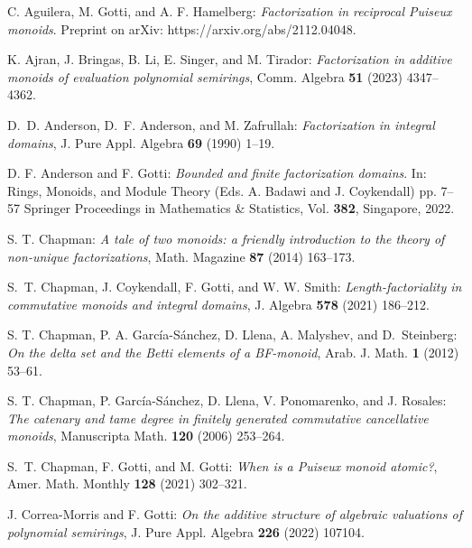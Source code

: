 \documentclass[12pt]{amsart}
\theoremstyle{definition}
\numberwithin{equation}{section}
\begin{document}
\bigskip
\begin{thebibliography}{20}
	
	 C. Aguilera, M. Gotti, and A. F. Hamelberg: \emph{Factorization in reciprocal Puiseux monoids}. Preprint on arXiv: https://arxiv.org/abs/2112.04048.
	
	 K. Ajran, J. Bringas, B. Li, E. Singer, and M. Tirador: \emph{Factorization in additive monoids of evaluation polynomial semirings}, Comm. Algebra \textbf{51} (2023) 4347--4362.
	
	 D.~D. Anderson, D.~F. Anderson, and M. Zafrullah: \emph{Factorization in integral domains}, J. Pure Appl. Algebra \textbf{69} (1990) 1--19.

	 D. F. Anderson and F. Gotti: \emph{Bounded and finite factorization domains}. In: Rings, Monoids, and Module Theory (Eds. A. Badawi and J. Coykendall) pp. 7--57 Springer Proceedings in Mathematics \& Statistics, Vol. \textbf{382}, Singapore, 2022.

	 S. T. Chapman: \emph{A tale of two monoids: a friendly introduction to the theory of non-unique factorizations}, Math. Magazine \textbf{87} (2014) 163--173.

	 S.~T. Chapman, J. Coykendall, F. Gotti, and W. W. Smith: \emph{Length-factoriality in commutative monoids and integral domains}, J. Algebra \textbf{578} (2021) 186--212.
	
	 S. T. Chapman, P. A. Garc\'ia-S\'anchez, D. Llena, A. Malyshev, and D.~Steinberg: \emph{On the delta set and the Betti elements of a BF-monoid}, Arab. J. Math. {\bf 1} (2012) 53--61.
	
	 S. T. Chapman, P. Garc\'ia-S\'anchez, D. Llena, V. Ponomarenko, and J. Rosales: \emph{The catenary and tame degree in finitely generated commutative cancellative monoids}, Manuscripta Math. \textbf{120} (2006) 253--264.
	

         S.~T. Chapman, F. Gotti, and M. Gotti: \emph{When is a Puiseux monoid atomic?}, Amer. Math. Monthly \textbf{128} (2021) 302--321.

	 J. Correa-Morris and F. Gotti: \emph{On the additive structure of algebraic valuations of polynomial semirings}, J. Pure Appl. Algebra \textbf{226} (2022) 107104.


\end{thebibliography}
\end{document}

